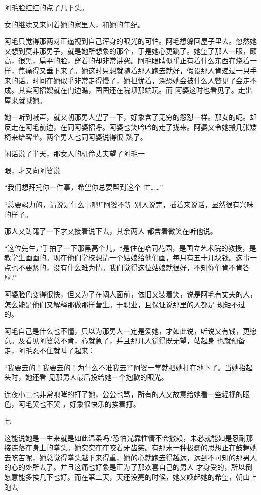 \documentclass{article}
\begin{document}
阿毛脸红红的点了几下头。 

\newpage

女的继续又来问着她的家里人，和她的年纪。

阿毛只觉得那两对正逼视到自己浑身的眼光的可怕。阿毛想躲回屋子里去。忽然她又想到莫非那男子，就是她所想象的那个，于是她心更跳了。她望了那人一眼，颇高，很黑，扁平的脸，穿着的却非常讲究。阿毛眼睛似乎正有着什么东西在烧着一样，焦痛得又垂下来了。她这时只想就随着那人跑去就好，假设那人肯递过一只手来的话。时间在她似乎非常走得慢了，她担忧着，深恐她会被什么人瞥见了会走不成。其实阿招嫂就在门边瞧，囝囝还在院坝那端玩。而
阿婆这时也看见了。走出屋来就喊她。 

她一听到喊声，就又朝那男人望了一下，好象含了无穷的怨怼一样。那女的呢。却反走在阿毛前边，在同阿婆招呼。阿婆也笑吟吟的走了拢来。阿婆又令她搬几张矮椅来给客坐。两个男人也同阿婆说得很
熟了。 

闲话说了半天，那女人的机伶丈夫望了阿毛一

\newpage
眼，才又向阿婆说 

“我们想拜托你一件事，希望你总要帮到这个
忙……” 

“总要竭力的，请说是什么事吧!”阿婆不等
别人说完，插着来说话，显然很有兴味的样子。 

那人又踌躇了一下才又接着说下去，其余两人
都含着微笑在听他说。 

“这位先生，”手拍了一下那黑高个儿，“是住在哈同花园，是国立艺术院的教授，是教学生画画的。现在他们学校想请一个姑娘给他们画，每月有五十几块钱。这事一点也不要紧的，没有什么难为情。我们觉得这位姑娘就很好，不知你们肯不肯答应?”

阿婆脸色变得很快，但又为了在阔人面前，依旧又装着笑，说是阿毛有丈夫的人，怎么能是他们又解释那做那样营生。于职业，且保证说那里的人都是
规矩不过的。 

\newpage

阿毛自己是什么也不懂，只以为那男人一定是爱她，才如此说，听说又有钱，更愿意。及看见阿婆总不肯，心就急了，并且那几人觉得既无望，站起身
也就预备走，阿毛忍不住就叫了起来： 

“我要去的！我要去的！为什么不准我去?”阿婆一掌就把她打在地下了。当她抬起头时，她还看
见那男人最后投给她一个抱歉的眼光。 

连夜小二也非常咆哮的打了她，公公也骂，所有的人又故意给她看一些轻视的眼色，阿毛哭也不哭
，好象很快乐的挨着打。 


七 

这能说她是一生来就是如此温柔吗?恐怕光靠性情不会撒赖，未必就能如是忍耐那接连落在身上的拳头。她实实在在咬着牙齿笑。有那末一种极蠢的思想正在鼓舞她去吃苦呢，她总觉得拳头越下来得重，她的心就跑去得越远，远到不可知的那男人的心的处所去了。并且这痛也好象是正为了那欢喜自己的男人
\newpage
才身受的，所以倒愿意能多挨几下也好。而在第二天，天还没亮的时候，她又唤起她的希望，朝山上跑去
\end{document}
